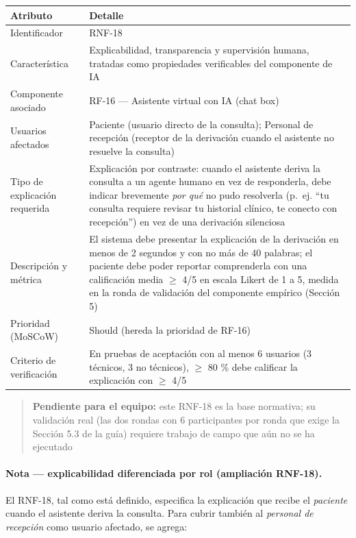 \documentclass[11pt,a4paper]{article}
\begin{document}
	\begin{longtable}{p{} p{}}
		
		\toprule
		\textbf{Atributo} & \textbf{Detalle} \\
		\midrule
		\endhead
		
		Identificador & RNF-18 \\
		Característica & Explicabilidad, transparencia y supervisión humana, tratadas como propiedades verificables del componente de IA \cite{whoai2021,euaiact2024} \\
		Componente asociado & RF-16 --- Asistente virtual con IA (chat box) \\
		Usuarios afectados & Paciente (usuario directo de la consulta); Personal de recepción (receptor de la derivación cuando el asistente no resuelve la consulta) \\
		Tipo de explicación requerida & Explicación por contraste: cuando el asistente deriva la consulta a un agente humano en vez de responderla, debe indicar brevemente \emph{por qué} no pudo resolverla (p.~ej. ``tu consulta requiere revisar tu historial clínico, te conecto con recepción'') en vez de una derivación silenciosa \\
		Descripción y métrica & El sistema debe presentar la explicación de la derivación en menos de 2 segundos y con no más de 40 palabras; el paciente debe poder reportar comprenderla con una calificación media \(\geq\) 4/5 en escala Likert de 1 a 5, medida en la ronda de validación del componente empírico (Sección 5) \\
		Prioridad (MoSCoW) & Should (hereda la prioridad de RF-16) \\
		Criterio de verificación & En pruebas de aceptación con al menos 6 usuarios (3 técnicos, 3 no técnicos), \(\geq\) 80 \% debe calificar la explicación con \(\geq\) 4/5 \\
		\bottomrule
	\end{longtable}
	
	\begin{quote}
		\textbf{Pendiente para el equipo:} este RNF-18 es la base normativa; su validación real (las dos rondas con 6 participantes por ronda que exige la Sección 5.3 de la guía) requiere trabajo de campo que aún no se ha ejecutado 
	\end{quote}
	
	\paragraph{Nota — explicabilidad diferenciada por rol (ampliación RNF-18).}
	El RNF-18, tal como está definido, especifica la explicación que recibe el
	\emph{paciente} cuando el asistente deriva la consulta. Para cubrir también
	al \emph{personal de recepción} como usuario afectado, se agrega:
	
\end{document}
